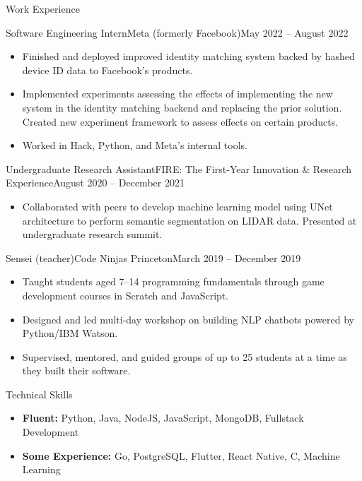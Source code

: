 \documentclass[]{mcdowellcv}
\begin{document}
	\begin{cvsection}{Work Experience}
		\begin{cvsubsection}{Software Engineering Intern}{Meta (formerly Facebook)}{May 2022 -- August 2022}
			\begin{itemize}
				\item Finished and deployed improved identity matching system backed by hashed device ID data to
				      Facebook's products.
				\item Implemented experiments assessing the effects of implementing the new system in the identity
					  matching backend and replacing the prior solution. Created new experiment framework to assess
					  effects on certain products.
				\item Worked in Hack, Python, and Meta's internal tools.
			\end{itemize}
		\end{cvsubsection}
		\begin{cvsubsection}{Undergraduate Research Assistant}{FIRE: The First-Year Innovation \& Research Experience}{August 2020 -- December 2021}
			\vspace{0.8em}
			\begin{itemize}
				\item Collaborated with peers to develop machine learning model using UNet architecture to perform
				      semantic segmentation on LIDAR data. Presented at undergraduate research summit.
			\end{itemize}
		\end{cvsubsection}
		\begin{cvsubsection}{Sensei (teacher)}{Code Ninjas Princeton}{March 2019 -- December 2019}
			\begin{itemize}
				\item Taught students aged 7--14 programming fundamentals through
					  game development courses in Scratch and JavaScript.
				\item Designed and led multi-day workshop on building NLP chatbots
				      powered by Python/IBM Watson.
				\item Supervised, mentored, and guided groups of up to 25 students at a time as they 
				      built their software.
			\end{itemize}
		\end{cvsubsection}
	\end{cvsection}

	\begin{cvsection}{Technical Skills}
		\begin{cvsubsection}{}{}{}
			\vspace{0.5em}
			\begin{itemize}
				\item \textbf{Fluent:} Python, Java, NodeJS, JavaScript, MongoDB, Fullstack Development
				\item \textbf{Some Experience:} Go, PostgreSQL, Flutter, React Native, C, Machine Learning
			\end{itemize}		
		\end{cvsubsection}
	\end{cvsection}
\end{document}

